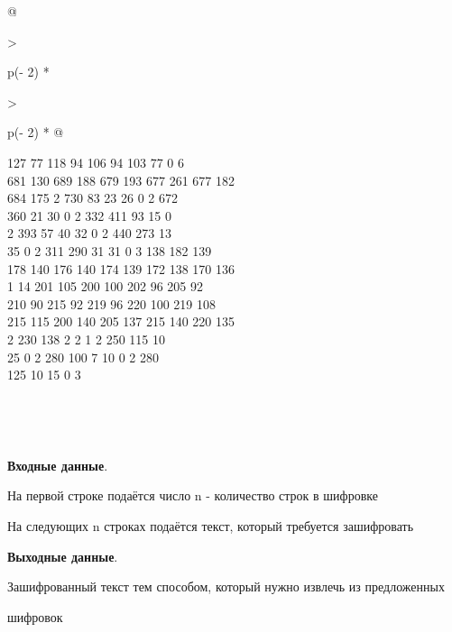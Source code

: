 \begin{question}
\begin{longtable}[]{@{}

  >{\raggedright\arraybackslash}p{(\columnwidth - 2\tabcolsep) * }

  >{\raggedright\arraybackslash}p{(\columnwidth - 2\tabcolsep) * }@{}}
\begin{minipage}[t]{\linewidth}
127 77 118 94 106 94 103 77 0 6\\

681 130 689 188 679 193 677 261 677 182\\

684 175 2 730 83 23 26 0 2 672\\

360 21 30 0 2 332 411 93 15 0\\

2 393 57 40 32 0 2 440 273 13\\

35 0 2 311 290 31 31 0 3 138 182 139\\

178 140 176 140 174 139 172 138 170 136\\

1 14 201 105 200 100 202 96 205 92\\

210 90 215 92 219 96 220 100 219 108\\

215 115 200 140 205 137 215 140 220 135\\

2 230 138 2 2 1 2 250 115 10\\

25 0 2 280 100 7 10 0 2 280\\

125 10 15 0 3



~\strut

\end{minipage} \\

\bottomrule

\end{longtable}



\textbf{Входные данные}.



На первой строке подаётся число n - количество строк в шифровке



На следующих n строках подаётся текст, который требуется зашифровать



\textbf{Выходные данные}.



Зашифрованный текст тем способом, который нужно извлечь из предложенных

шифровок


\end{question}

